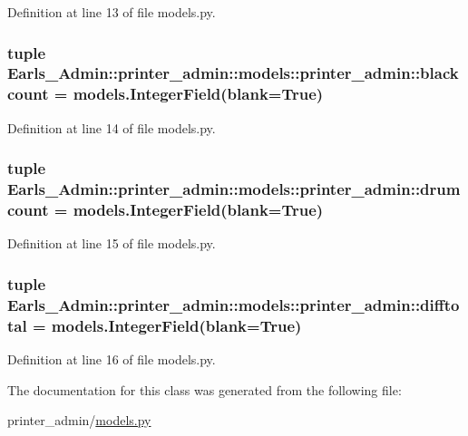 Definition at line 13 of file models.py.\hypertarget{classEarls__Admin_1_1printer__admin_1_1models_1_1printer__admin_c954cda354eee56c8f52f9eccbb399a7}{
\subsubsection[blackcount]{\setlength{\rightskip}{0pt plus 5cm}tuple {\bf Earls\_\-Admin::printer\_\-admin::models::printer\_\-admin::blackcount} = models.IntegerField(blank=True)}}
\label{classEarls__Admin_1_1printer__admin_1_1models_1_1printer__admin_c954cda354eee56c8f52f9eccbb399a7}




Definition at line 14 of file models.py.\hypertarget{classEarls__Admin_1_1printer__admin_1_1models_1_1printer__admin_678494b47a45fe045e2d64e3ab6bdffb}{
\subsubsection[drumcount]{\setlength{\rightskip}{0pt plus 5cm}tuple {\bf Earls\_\-Admin::printer\_\-admin::models::printer\_\-admin::drumcount} = models.IntegerField(blank=True)}}
\label{classEarls__Admin_1_1printer__admin_1_1models_1_1printer__admin_678494b47a45fe045e2d64e3ab6bdffb}




Definition at line 15 of file models.py.\hypertarget{classEarls__Admin_1_1printer__admin_1_1models_1_1printer__admin_fbceac6bc0d804e01ae841ad8f0ab8f8}{
\subsubsection[difftotal]{\setlength{\rightskip}{0pt plus 5cm}tuple {\bf Earls\_\-Admin::printer\_\-admin::models::printer\_\-admin::difftotal} = models.IntegerField(blank=True)}}
\label{classEarls__Admin_1_1printer__admin_1_1models_1_1printer__admin_fbceac6bc0d804e01ae841ad8f0ab8f8}




Definition at line 16 of file models.py.

The documentation for this class was generated from the following file:\begin{CompactItemize}
\item 
printer\_\-admin/\hyperlink{printer__admin_2models_8py}{models.py}\end{CompactItemize}
